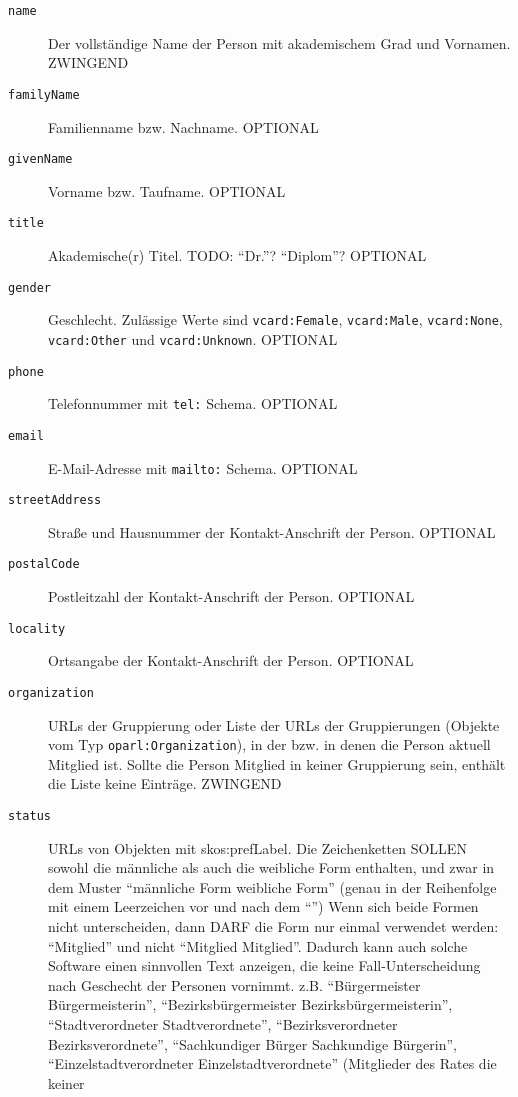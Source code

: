 \documentclass[,a4paper]{article}
\begin{document}
\begin{description}
\item[\texttt{name}]
Der vollständige Name der Person mit akademischem Grad und Vornamen.
ZWINGEND
\item[\texttt{familyName}]
Familienname bzw. Nachname. OPTIONAL
\item[\texttt{givenName}]
Vorname bzw. Taufname. OPTIONAL
\item[\texttt{title}]
Akademische(r) Titel. TODO: ``Dr.''? ``Diplom''? OPTIONAL
\item[\texttt{gender}]
Geschlecht. Zulässige Werte sind \texttt{vcard:Female},
\texttt{vcard:Male}, \texttt{vcard:None}, \texttt{vcard:Other} und
\texttt{vcard:Unknown}. OPTIONAL
\item[\texttt{phone}]
Telefonnummer mit \texttt{tel:} Schema. OPTIONAL
\item[\texttt{email}]
E-Mail-Adresse mit \texttt{mailto:} Schema. OPTIONAL
\item[\texttt{streetAddress}]
Straße und Hausnummer der Kontakt-Anschrift der Person. OPTIONAL
\item[\texttt{postalCode}]
Postleitzahl der Kontakt-Anschrift der Person. OPTIONAL
\item[\texttt{locality}]
Ortsangabe der Kontakt-Anschrift der Person. OPTIONAL
\item[\texttt{organization}]
URLs der Gruppierung oder Liste der URLs der Gruppierungen (Objekte vom
Typ \texttt{oparl:Organization}), in der bzw. in denen die Person
aktuell Mitglied ist. Sollte die Person Mitglied in keiner Gruppierung
sein, enthält die Liste keine Einträge. ZWINGEND
\item[\texttt{status}]
URLs von Objekten mit skos:prefLabel. Die Zeichenketten SOLLEN sowohl
die männliche als auch die weibliche Form enthalten, und zwar in dem
Muster ``männliche Form \textbar{} weibliche Form'' (genau in der
Reihenfolge mit einem Leerzeichen vor und nach dem ``\textbar{}'') Wenn
sich beide Formen nicht unterscheiden, dann DARF die Form nur einmal
verwendet werden: ``Mitglied'' und nicht ``Mitglied \textbar{}
Mitglied''. Dadurch kann auch solche Software einen sinnvollen Text
anzeigen, die keine Fall-Unterscheidung nach Geschecht der Personen
vornimmt. z.B. ``Bürgermeister \textbar{} Bürgermeisterin'',
``Bezirksbürgermeister \textbar{} Bezirksbürgermeisterin'',
``Stadtverordneter \textbar{} Stadtverordnete'', ``Bezirksverordneter
\textbar{} Bezirksverordnete'', ``Sachkundiger Bürger \textbar{}
Sachkundige Bürgerin'', ``Einzelstadtverordneter \textbar{}
Einzelstadtverordnete'' (Mitglieder des Rates die keiner

\end{description}
\end{document}
